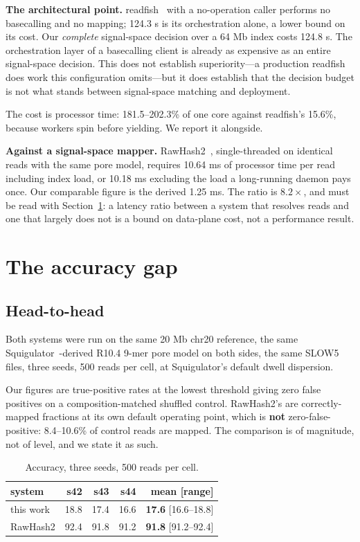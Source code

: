\documentclass[conference]{IEEEtran}
\begin{document}
\textbf{The architectural point.} readfish~\cite{readfish} with a no-operation caller
performs no basecalling
and no mapping; 124.3 \textmu{}s is its orchestration alone, a lower bound on its cost. Our
\emph{complete} signal-space decision over a 64 Mb index costs 124.8 \textmu{}s. The orchestration layer
of a basecalling client is already as expensive as an entire signal-space decision. This does
not establish superiority---a production readfish does work this configuration omits---but it
does establish that the decision budget is not what stands between signal-space matching and
deployment.

The cost is processor time: 181.5--202.3\% of one core against readfish's 15.6\%, because
workers spin before yielding. We report it alongside.

\textbf{Against a signal-space mapper.} RawHash2~\cite{rawhash2}, single-threaded on
identical reads with the
same pore model, requires 10.64 ms of processor time per read including index load, or 10.18 ms
excluding the load a long-running daemon pays once. Our comparable figure is the derived
1.25 ms. The ratio is $8.2\times$, and must be read with Section~\ref{sec:gap}: a latency ratio between a
system that resolves reads and one that largely does not is a bound on data-plane cost, not a
performance result.

\section{The accuracy gap}
\label{sec:gap}

\subsection{Head-to-head}

Both systems were run on the same 20 Mb chr20 reference, the same
Squigulator~\cite{squigulator}-derived R10.4
9-mer pore model on both sides, the same SLOW5 files, three seeds, 500 reads per cell, at
Squigulator's default dwell dispersion.

Our figures are true-positive rates at the lowest threshold giving zero false positives on a
composition-matched shuffled control. RawHash2's are correctly-mapped fractions at its own
default operating point, which is \textbf{not} zero-false-positive: 8.4--10.6\% of control reads
are mapped. The comparison is of magnitude, not of level, and we state it as such.

\begin{table}[t]
\caption{Accuracy, three seeds, 500 reads per cell.}
\label{tab:acc}
\centering
\footnotesize
\begin{tabular}{lrrrr}
\toprule
system & s42 & s43 & s44 & mean [range] \\
\midrule
this work  & 18.8 & 17.4 & 16.6 & \textbf{17.6} [16.6--18.8] \\
RawHash2   & 92.4 & 91.8 & 91.2 & \textbf{91.8} [91.2--92.4] \\
\bottomrule
\end{tabular}
\end{table}
\end{document}
